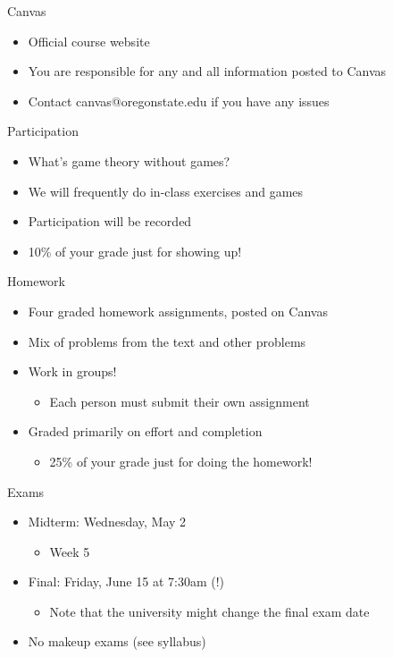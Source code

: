 \documentclass[10pt]{beamer}
\begin{document}
\begin{frame}[label={sec:org0cb571f}]{}
\alert{Canvas}
\begin{itemize}
\item Official course website
\item You are responsible for any and all information posted to Canvas
\item Contact canvas@oregonstate.edu if you have any issues
\end{itemize}
\end{frame}

\begin{frame}[label={sec:orgd9cdc01}]{}
\alert{Participation}
\begin{itemize}
\item What's game theory without games?
\item We will frequently do in-class exercises and games
\item Participation will be recorded
\item 10\% of your grade just for showing up!
\end{itemize}
\end{frame}

\begin{frame}[label={sec:org033cd39}]{}
\alert{Homework}
\begin{itemize}
\item Four graded homework assignments, posted on Canvas
\item Mix of problems from the text and other problems
\item Work in groups!
\begin{itemize}
\item Each person must submit their own assignment
\end{itemize}
\item Graded primarily on effort and completion
\begin{itemize}
\item 25\% of your grade just for doing the homework!
\end{itemize}
\end{itemize}
\end{frame}

\begin{frame}[label={sec:org6211e8e}]{}
\alert{Exams}
\begin{itemize}
\item Midterm: Wednesday, May 2 
\begin{itemize}
\item Week 5
\end{itemize}
\item Final: Friday, June 15 at 7:30am (!)
\begin{itemize}
\item Note that the university might change the final exam date
\end{itemize}
\item No makeup exams (see syllabus)
\end{itemize}
\end{frame}
\end{document}
